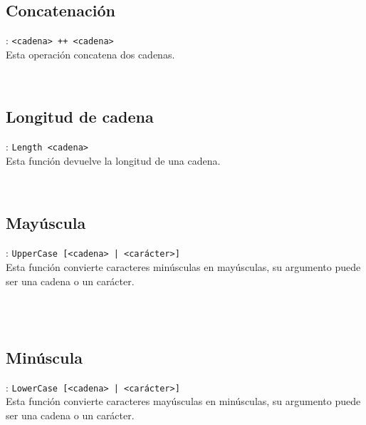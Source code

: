       \subsection*{Concatenación}: \texttt{<cadena>~++~<cadena>}\\
      Esta operación concatena dos cadenas.
      
      \begin{fxcode}
         \\
      \end{fxcode}
      
      \subsection*{Longitud de cadena}: \texttt{Length <cadena>}\\
      Esta función devuelve la longitud de una cadena.
      
      \begin{fxcode}
         \\
      \end{fxcode}
      
      \subsection*{Mayúscula}: \texttt{UpperCase [<cadena> | <carácter>]}\\
      Esta función convierte caracteres minúsculas en mayúsculas, su argumento puede ser una cadena o un carácter.
      
      \begin{fxcode}
         \\
         \\
      \end{fxcode}
      
      \subsection*{Minúscula}: \texttt{LowerCase [<cadena> | <carácter>]}\\
      Esta función convierte caracteres mayúsculas en minúsculas, su argumento puede ser una cadena o un carácter.
      
